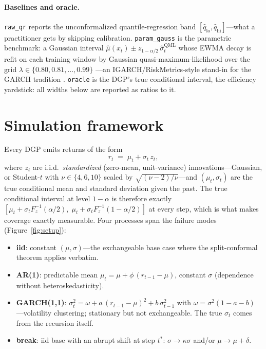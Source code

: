 \documentclass[11pt]{article}
\begin{document}
\paragraph{Baselines and oracle.} \texttt{raw\_qr} reports the
unconformalized quantile-regression band
$[\hat{q}_{\mathrm{lo}},\hat{q}_{\mathrm{hi}}]$---what a practitioner gets by
skipping calibration. \texttt{param\_gauss} is the parametric benchmark: a
Gaussian interval $\hat\mu(x_t)\pm z_{1-\alpha/2}\,\hat\sigma_t^{\mathrm{QML}}$
whose EWMA decay is refit on each training window by Gaussian
quasi-maximum-likelihood over the grid $\lambda\in\{0.80,0.81,\dots,0.99\}$%
---an IGARCH/RiskMetrics-style stand-in for the GARCH tradition
\citep{engle1982autoregressive,bollerslev1986generalized}. \texttt{oracle} is
the DGP's true conditional interval, the efficiency yardstick: all widths
below are reported as ratios to it.

\section{Simulation framework}
\label{sec:framework}

Every DGP emits returns of the form
\begin{equation}
r_t \;=\; \mu_t + \sigma_t\, z_t,
\label{eq:dgp}
\end{equation}
where $z_t$ are i.i.d.\ \emph{standardized} (zero-mean, unit-variance)
innovations---Gaussian, or Student-$t$ with $\nu\in\{4,6,10\}$ scaled by
$\sqrt{(\nu-2)/\nu}$---and $(\mu_t,\sigma_t)$ are the true conditional mean
and standard deviation given the past. The true conditional interval at level
$1-\alpha$ is therefore exactly
$[\mu_t+\sigma_t F_z^{-1}(\alpha/2),\;\mu_t+\sigma_t F_z^{-1}(1-\alpha/2)]$ at
every step, which is what makes coverage exactly measurable. Four processes
span the failure modes (Figure~\ref{fig:setup}):
\begin{itemize}\itemsep2pt
\item \textbf{iid}: constant $(\mu,\sigma)$---the exchangeable base case where
the split-conformal theorem applies verbatim.
\item \textbf{AR(1)}: predictable mean $\mu_t=\mu+\phi\,(r_{t-1}-\mu)$,
constant $\sigma$ (dependence without heteroskedasticity).
\item \textbf{GARCH(1,1)}: $\sigma_t^2=\omega+a\,(r_{t-1}-\mu)^2+b\,\sigma_{t-1}^2$
with $\omega=\sigma^2(1-a-b)$ \citep{bollerslev1986generalized}---volatility
clustering; stationary but not exchangeable. The true $\sigma_t$ comes from
the recursion itself.
\item \textbf{break}: iid base with an abrupt shift at step $t^\ast$:
$\sigma\to\kappa\sigma$ and/or $\mu\to\mu+\delta$.
\end{itemize}
\end{document}
